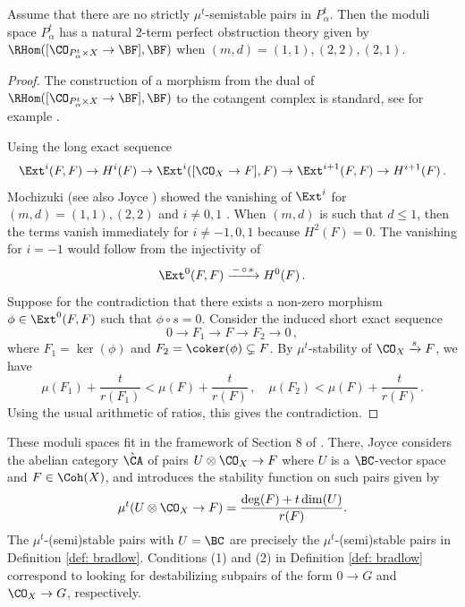 \begin{lemma}
\notready
\label{Lem:obs}
Assume that there are no strictly $\mu^t$-semistable pairs in $P^t_\alpha$. Then the moduli space $P^t_\alpha$ has a natural 2-term perfect obstruction theory given by $\RHom([\CO_{P^t_\alpha\times X}\to \BF], \BF)$ when $(m,d) = (1,1),(2,2),(2,1)$.
\end{lemma}
\begin{proof}
The construction of a morphism from the dual of $\RHom([\CO_{P^t_\alpha \times X}\to \BF], \BF)$ to the cotangent complex is standard, see for example \cite[Section 5.3]{mochizuki}.

Using the long exact sequence
\[\Ext^{i}(F, F)\to H^{i}(F)\to\Ext^{i}([\CO_X\to F], F)\to \Ext^{i+1}(F, F)\to H^{i+1}(F)\,.\]
Mochizuki \cite[Lemma 6.1.14]{mochizuki} (see also Joyce \cite[Section 8.3.2]{Jo21}) showed the vanishing of $\Ext^i$ for $(m,d) = (1,1),(2,2)$ and $i\neq  0,1$ . When $(m,d)$ is such that $d\leq 1$, then the terms vanish immediately for $i\neq-1,0,1$ because $H^2(F) = 0$.
The vanishing for $i=-1$ would follow from the injectivity of
$$\Ext^0(F,F)\xrightarrow{\,-\,\circ\, s\,} H^0(F)\,.
$$
Suppose for the contradiction that there exists a non-zero morphism $\phi\in \Ext^0(F,F)$ such that $\phi\circ s=0$. Consider the induced short exact sequence
$$0\rightarrow F_1\rightarrow F\rightarrow F_2\rightarrow 0\,,
$$
where $F_1=\ker(\phi)$ and $F_2=\coker(\phi)\subsetneq F$. By $\mu^t$-stability of $\CO_X\xrightarrow{s} F$, we have
$$\mu(F_1)+\frac{t}{r(F_1)}<\mu(F)+\frac{t}{r(F)}\,,\quad \mu(F_2)<\mu(F)+\frac{t}{r(F)}\,.
$$
Using the usual arithmetic of ratios, this gives the contradiction.
\end{proof}


These moduli spaces fit in the framework of Section 8 of \cite{Jo21}. There, Joyce considers the abelian category $\grave{\CA}$ of pairs $U\otimes \CO_X\to F$ where $U$ is a $\BC$-vector space and $F\in \Coh(X)$, and introduces the stability function on such pairs given by
\[\mu^t(U\otimes \CO_X\to F)=\frac{\deg(F)+t \dim(U)}{r(F)}.\]
The $\mu^t$-(semi)stable pairs with $U=\BC$ are precisely the $\mu^t$-(semi)stable pairs in Definition \ref{def: bradlow}. Conditions (1) and (2) in Definition \ref{def: bradlow} correspond to looking for destabilizing subpairs of the form $0\to G$ and $\CO_X\to G$, respectively.

